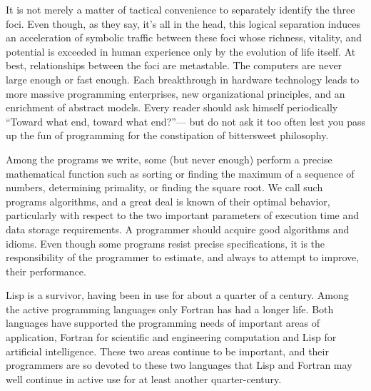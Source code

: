 It is not merely a matter of tactical convenience to separately identify the three foci.
Even though, as they say, it’s all in the head, this logical separation induces an acceleration of symbolic traffic between these foci whose richness, vitality, and potential is exceeded in human experience only by the evolution of life itself.
At best, relationships between the foci are metastable.
The computers are never large enough or fast enough.
Each breakthrough in hardware technology leads to more massive programming enterprises, new organizational principles, and an enrichment of abstract models.
Every reader should ask himself periodically “Toward what end, toward what end?”---%
but do not ask it too often lest you pass up the fun of programming for the constipation of bittersweet philosophy.

Among the programs we write, some (but never enough) perform a precise mathematical function such as sorting or finding the maximum of a sequence of numbers, determining primality, or finding the square root.
We call such programs algorithms, and a great deal is known of their optimal behavior, particularly with respect to the two important parameters of execution time and data storage requirements.
A programmer should acquire good algorithms and idioms.
Even though some programs resist precise specifications, it is the responsibility of the programmer to estimate, and always to attempt to improve, their performance.

Lisp is a survivor, having been in use for about a quarter of a century.
Among the active programming languages only Fortran has had a longer life.
Both languages have supported the programming needs of important areas of application, Fortran for scientific and engineering computation and Lisp for artificial intelligence.
These two areas continue to be important, and their programmers are so devoted to these two languages that Lisp and Fortran may well continue in active use for at least another quarter-century.

